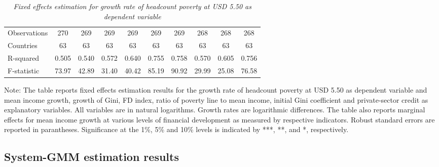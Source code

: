 \documentclass[12pt, a4paper]{article}
\begin{document}
\begin{table}[htbp]
\begin{threeparttable}
{\begin{tabular}{l*{9}{c}}
				\hline
				Observations        &         270         &         269         &         269         &         269         &         269         &         269         &         268         &         268         &         268         \\
				Countries           &          63         &          63         &          63         &          63         &          63         &          63         &          63         &          63         &          63         \\
				R-squared           &       0.505         &       0.540         &       0.572         &       0.640         &       0.755         &       0.758         &       0.570         &       0.605         &       0.756         \\
				F-statistic         &       73.97         &       42.89         &       31.40         &       40.42         &       85.19         &       90.92         &       29.99         &       25.08         &       76.58         \\
				\hline\hline
			\end{tabular}
		}
		\begin{tablenotes}
			\item \scriptsize{Note: The table reports fixed effects estimation results for the growth rate of headcount poverty at USD 5.50 as dependent variable and mean income growth, growth of Gini, FD index, ratio of poverty line to mean income, initial Gini coefficient and private-sector credit as explanatory variables. All variables are in natural logarithms. Growth rates are logarithmic differences. The table also reports marginal effects for mean income growth at various levels of financial development as measured by respective indicators. Robust standard errors are reported in parantheses. Significance at the 1\%, 5\% and 10\% levels is indicated by ***, **, and *, respectively.}
		\end{tablenotes}
	\end{threeparttable}
	\caption[Fixed Effects Estimation Results for Headcount Poverty at USD 5.50]{\textit{Fixed effects estimation for growth rate of headcount poverty at USD 5.50 as dependent variable}}
	\label{FE550}
\end{table}

\newpage
\subsection{System-GMM estimation results}
\end{document}
